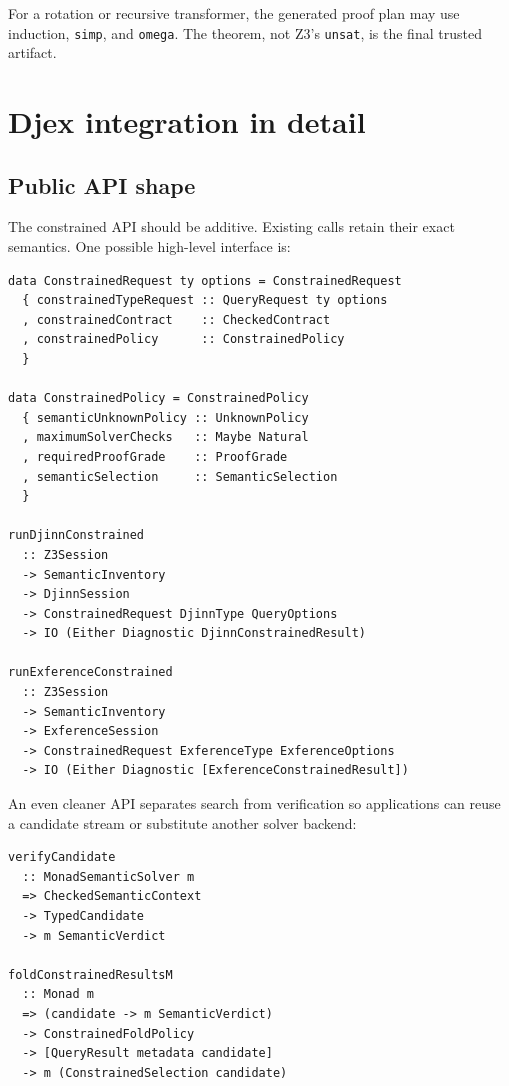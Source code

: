 \documentclass[11pt,oneside]{article}
\newcommand{\code}[1]{\texttt{#1}}
\begin{document}
For a rotation or recursive transformer, the generated proof plan may use induction,
\code{simp}, and \code{omega}. The theorem, not Z3's \code{unsat}, is the final trusted
artifact.

\section{Djex integration in detail}

\subsection{Public API shape}

The constrained API should be additive. Existing calls retain their exact semantics.
One possible high-level interface is:

\begin{lstlisting}[language=HaskellExt,caption={Additive constrained-query API}]
data ConstrainedRequest ty options = ConstrainedRequest
  { constrainedTypeRequest :: QueryRequest ty options
  , constrainedContract    :: CheckedContract
  , constrainedPolicy      :: ConstrainedPolicy
  }

data ConstrainedPolicy = ConstrainedPolicy
  { semanticUnknownPolicy :: UnknownPolicy
  , maximumSolverChecks   :: Maybe Natural
  , requiredProofGrade    :: ProofGrade
  , semanticSelection     :: SemanticSelection
  }

runDjinnConstrained
  :: Z3Session
  -> SemanticInventory
  -> DjinnSession
  -> ConstrainedRequest DjinnType QueryOptions
  -> IO (Either Diagnostic DjinnConstrainedResult)

runExferenceConstrained
  :: Z3Session
  -> SemanticInventory
  -> ExferenceSession
  -> ConstrainedRequest ExferenceType ExferenceOptions
  -> IO (Either Diagnostic [ExferenceConstrainedResult])
\end{lstlisting}

An even cleaner API separates search from verification so applications can reuse a
candidate stream or substitute another solver backend:

\begin{lstlisting}[language=HaskellExt]
verifyCandidate
  :: MonadSemanticSolver m
  => CheckedSemanticContext
  -> TypedCandidate
  -> m SemanticVerdict

foldConstrainedResultsM
  :: Monad m
  => (candidate -> m SemanticVerdict)
  -> ConstrainedFoldPolicy
  -> [QueryResult metadata candidate]
  -> m (ConstrainedSelection candidate)
\end{lstlisting}
\end{document}
